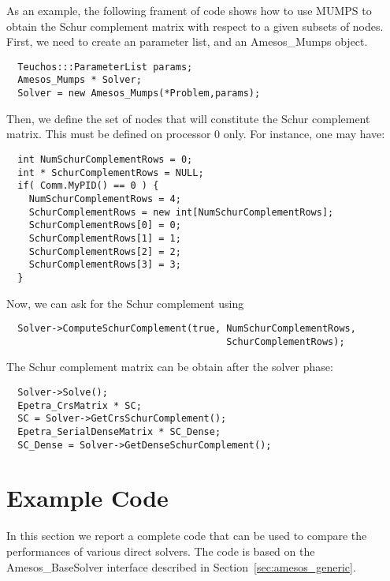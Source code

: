 \documentclass[11pt]{SANDreport}
\begin{document}
As an example, the following frament of code shows how to use MUMPS to
obtain the Schur complement matrix with respect to a given subsets of
nodes.  First, we need to create an parameter list, and an Amesos\_Mumps
object.
\begin{verbatim}
  Teuchos:::ParameterList params;
  Amesos_Mumps * Solver;
  Solver = new Amesos_Mumps(*Problem,params);
\end{verbatim}
Then, we define the set of nodes that will constitute the Schur
complement matrix. This must be defined on processor 0 only. For
instance, one may have:
\begin{verbatim}
  int NumSchurComplementRows = 0;
  int * SchurComplementRows = NULL;
  if( Comm.MyPID() == 0 ) {
    NumSchurComplementRows = 4;
    SchurComplementRows = new int[NumSchurComplementRows];
    SchurComplementRows[0] = 0;
    SchurComplementRows[1] = 1; 
    SchurComplementRows[2] = 2;
    SchurComplementRows[3] = 3;
  }
\end{verbatim}
Now, we can ask for the Schur complement using
\begin{verbatim}  
  Solver->ComputeSchurComplement(true, NumSchurComplementRows,
                                       SchurComplementRows);
\end{verbatim}
The Schur complement matrix can be obtain after the solver phase:  
\begin{verbatim}  
  Solver->Solve();
  Epetra_CrsMatrix * SC;
  SC = Solver->GetCrsSchurComplement();
  Epetra_SerialDenseMatrix * SC_Dense;
  SC_Dense = Solver->GetDenseSchurComplement();
\end{verbatim}




\section{Example Code}
\label{sec:comparison}

In this section we report a complete code that can be used to compare
the performances of various direct solvers. The code is based on the
Amesos\_BaseSolver interface described in
Section~\ref{sec:amesos_generic}.
\end{document}
